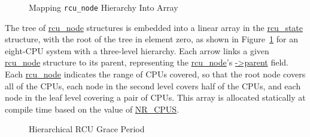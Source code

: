 \begin{figure}[htb]
\begin{center}
\end{center}
\caption{Mapping {\tt rcu\_node} Hierarchy Into Array}
\label{fig:app:rcuimpl:rcutree:Mapping rcu-node Hierarchy Into Array}
\end{figure}

The tree of \url{rcu_node} structures is embedded into
a linear array in the \url{rcu_state} structure,
with the root of the tree in element zero, as shown in
Figure~\ref{fig:app:rcuimpl:rcutree:Mapping rcu-node Hierarchy Into Array}
for an eight-CPU
system with a three-level hierarchy.
Each arrow links a given \url{rcu_node} structure to its parent,
representing the \url{rcu_node}'s \url{->parent} field.
Each \url{rcu_node} indicates the range of CPUs covered,
so that the root node covers all of the CPUs, each node in the second
level covers half of the CPUs, and each node in the leaf level covering
a pair of CPUs.
This array is allocated statically at compile time based on the value
of \url{NR_CPUS}.

\begin{figure}[htbp]
\begin{center}
\end{center}
\caption{Hierarchical RCU Grace Period}
\label{fig:app:rcuimpl:rcutree:Hierarchical RCU Grace Period}
\end{figure}

